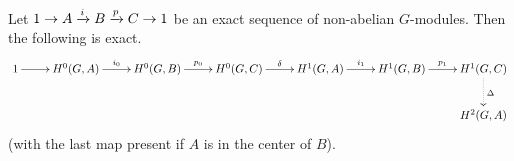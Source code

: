 \begin{thm}
Let $1\to A\xrightarrow{i} B \xrightarrow{p} C\to 1$ be an exact sequence of non-abelian $G$-modules. Then the following is exact.
\[
\xymatrix{
1\ar[r] & H^0(G,A) \ar[r]^{i_0} & H^0(G,B) \ar[r]^{p_0} & H^0(G,C) \ar[r]^{\de} & H^1(G,A) \ar[r]^{i_1} & H^1(G,B) \ar[r]^{p_1} & H^1(G,C) \ar@{.>}[d]^{\De}\\
&&&&& & H^2(G,A)
}
\]
(with the last map present if $A$ is in the center of $B$).
\end{thm}
